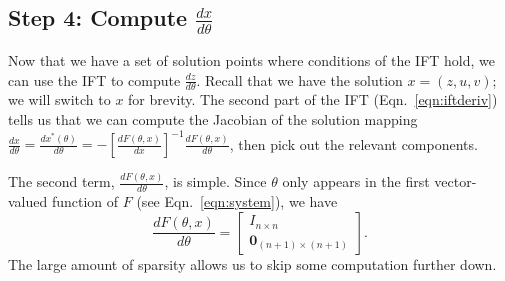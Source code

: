 \documentclass[11pt]{article}
\begin{document}
\subsection*{Step 4: Compute $\frac{dx}{d\theta}$}
Now that we have a set of solution points where conditions of the IFT hold,
we can use the IFT to compute $\frac{dz}{d\theta}$.
Recall that we have the solution $x = (z,u,v)$; we will switch to $x$ for brevity.
The second part of the IFT (Eqn.~\ref{eqn:iftderiv})
tells us that we can compute the Jacobian of the
solution mapping $\frac{dx}{d\theta} = \frac{dx^*(\theta)}{d\theta}
= -\left[\frac{dF(\theta,x)}{dx}\right]^{-1}\frac{dF(\theta,x)}{d\theta}$,
then pick out the relevant components.

The second term, $\frac{dF(\theta,x)}{d\theta}$, is simple.
Since $\theta$ only appears in the first vector-valued function of $F$
(see Eqn.~\ref{eqn:system}), we have
\begin{equation}
\label{eqn:df-dtheta}
\frac{dF(\theta,x)}{d\theta} = \begin{bmatrix}
    I_{n\times n}\\
    \mathbf{0}_{(n+1)\times (n+1)}
\end{bmatrix}.
\end{equation}
The large amount of sparsity allows us to skip some computation further down.
\end{document}
